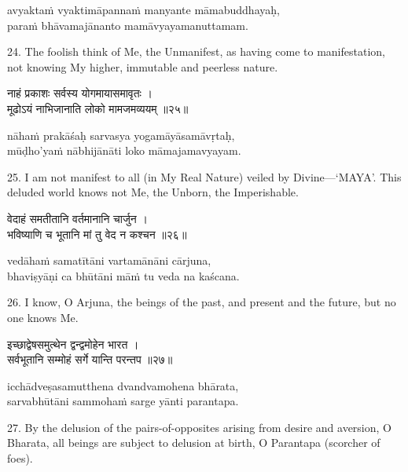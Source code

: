 \begin{transliteration}
avyaktaṁ vyaktimāpannaṁ manyante māmabuddhayaḥ, \\
paraṁ bhāvamajānanto mamāvyayamanuttamam.
\end{transliteration}

24. The foolish think of Me, the Unmanifest, as having come to manifestation,
not knowing My higher, immutable and peerless nature.

\begin{gitaverse}
नाहं प्रकाशः सर्वस्य योगमायासमावृतः । \\
मूढोऽयं नाभिजानाति लोको मामजमव्ययम् ॥२५॥
\end{gitaverse}

\begin{transliteration}
nāhaṁ prakāśaḥ sarvasya yogamāyāsamāvṛtaḥ, \\
mūḍho'yaṁ nābhijānāti loko māmajamavyayam.
\end{transliteration}

25. I am not manifest to all (in My Real Nature) veiled by Divine---`MAYA'. This
deluded world knows not Me, the Unborn, the Imperishable.

\begin{gitaverse}
वेदाहं समतीतानि वर्तमानानि चार्जुन । \\
भविष्याणि च भूतानि मां तु वेद न कश्चन ॥२६॥
\end{gitaverse}

\begin{transliteration}
vedāhaṁ samatītāni vartamānāni cārjuna, \\
bhaviṣyāṇi ca bhūtāni māṁ tu veda na kaścana.
\end{transliteration}

26. I know, O Arjuna, the beings of the past, and present and the future, but
no one knows Me.

\begin{gitaverse}
इच्छाद्वेषसमुत्थेन द्वन्द्वमोहेन भारत । \\
सर्वभूतानि सम्मोहं सर्गे यान्ति परन्तप ॥२७॥
\end{gitaverse}

\begin{transliteration}
icchādveṣasamutthena dvandvamohena bhārata, \\
sarvabhūtāni sammohaṁ sarge yānti parantapa.
\end{transliteration}

27. By the delusion of the pairs-of-opposites arising from desire and aversion,
O Bharata, all beings are subject to delusion at birth, O Parantapa (scorcher
of foes).


